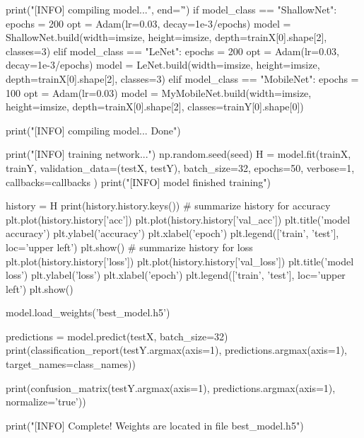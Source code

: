 \begin{python}
print("[INFO] compiling model...", end='\r')
if model_class == "ShallowNet":
    epochs = 200
    opt = Adam(lr=0.03, decay=1e-3/epochs)
    model = ShallowNet.build(width=imsize, height=imsize, depth=trainX[0].shape[2], classes=3)
elif model_class == "LeNet":
    epochs = 200
    opt = Adam(lr=0.03, decay=1e-3/epochs)
    model = LeNet.build(width=imsize, height=imsize, depth=trainX[0].shape[2], classes=3)
elif model_class == "MobileNet":
    epochs = 100
    opt = Adam(lr=0.03)
    model = MyMobileNet.build(width=imsize, height=imsize, depth=trainX[0].shape[2], classes=trainY[0].shape[0])

print("[INFO] compiling model... Done")

print("[INFO] training network...")
np.random.seed(seed)
H = model.fit(trainX, trainY, 
              validation_data=(testX, testY), 
              batch_size=32, 
              epochs=50, 
              verbose=1,
              callbacks=callbacks
             )
print("[INFO] model finished training")

history = H
print(history.history.keys())
# summarize history for accuracy
plt.plot(history.history['acc'])
plt.plot(history.history['val_acc'])
plt.title('model accuracy')
plt.ylabel('accuracy')
plt.xlabel('epoch')
plt.legend(['train', 'test'], loc='upper left')
plt.show()
# summarize history for loss
plt.plot(history.history['loss'])
plt.plot(history.history['val_loss'])
plt.title('model loss')
plt.ylabel('loss')
plt.xlabel('epoch')
plt.legend(['train', 'test'], loc='upper left')
plt.show()

model.load_weights('best_model.h5')

predictions = model.predict(testX, batch_size=32) 
print(classification_report(testY.argmax(axis=1),
    predictions.argmax(axis=1), target_names=class_names))


print(confusion_matrix(testY.argmax(axis=1),
    predictions.argmax(axis=1), normalize='true'))

print("[INFO] Complete! Weights are located in file best_model.h5")

\end{python}
%
